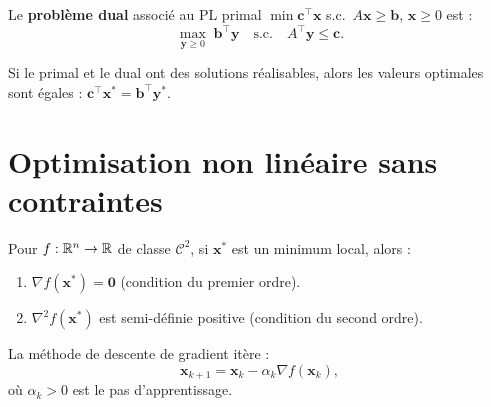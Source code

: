 \begin{definition}[Dualit\'e]
Le \textbf{probl\`eme dual} associ\'e au PL primal
$\min \mathbf{c}^\top\mathbf{x}$ s.c.\ $A\mathbf{x}\geq\mathbf{b}$,
$\mathbf{x}\geq 0$ est :
\[
  \max_{\mathbf{y}\geq 0}\;\mathbf{b}^\top\mathbf{y}
  \quad\text{s.c.}\quad
  A^\top\mathbf{y}\leq\mathbf{c}.
\]
\end{definition}

\begin{theoreme}
Si le primal et le dual ont des solutions r\'ealisables, alors les
valeurs optimales sont \'egales :
$\mathbf{c}^\top\mathbf{x}^* = \mathbf{b}^\top\mathbf{y}^*$.
\end{theoreme}

\section{Optimisation non lin\'eaire sans contraintes}
\label{sec:sans_contraintes}

\begin{definition}
Pour $f:\mathbb{R}^n\to\mathbb{R}$ de classe $\mathcal{C}^2$, si $\mathbf{x}^*$
est un minimum local, alors :
\begin{enumerate}
  \item $\nabla f(\mathbf{x}^*) = \mathbf{0}$ (condition du premier ordre).
  \item $\nabla^2 f(\mathbf{x}^*)$ est semi-d\'efinie positive
    (condition du second ordre).
\end{enumerate}
\end{definition}

\begin{definition}
La m\'ethode de descente de gradient it\`ere :
\[
  \mathbf{x}_{k+1} = \mathbf{x}_k - \alpha_k\nabla f(\mathbf{x}_k),
\]
o\`u $\alpha_k>0$ est le pas d'apprentissage.
\end{definition}

